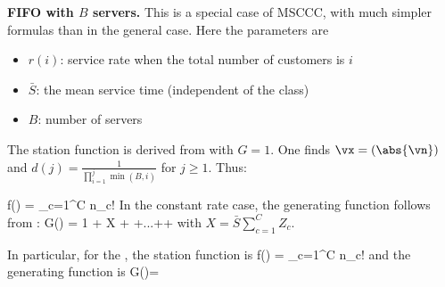 \textbf{FIFO with $B$ servers.} This is a special
case of MSCCC, with much simpler formulas than in
        the general case. Here the parameters are
    \begin{itemize}
         \item$r(i)$: service rate when the total number
             of customers is $i$
         \item $\bar{S}$: the mean service time
             (independent of the class)
             \item $B$: number of servers
\end{itemize}
The station function is derived from  with
$G=1$. One finds $\vx=(\abs{\vn})$ and $d(j)=
\frac{1}{\prod_{i=1}^j \min(B,i)}$ for $j\geq 1$. Thus:

\be f(\vn)   =
 \frac{\abs{\vn} !}
{\prod_{c=1}^C
 n_c!
  }\label{eq-q-stat-fifo}
 \ee
In the constant rate case, the generating
function follows from :
 \be
G(\vZ) = 1 + X + 
+...++ \label{eq-q-stat-fifo-z} \ee
with $X=\bar{S}\sum_{c=1}^C Z_c$.

In particular, for the , the station function is \be f(\vn) =
{\prod_{c=1}^C n_c! }\label{eq-q-stat-fifo1}\ee
and the generating function is
 \be
G(\vZ)=
\label{eq-q-qnet-gen-f-fifo}
 \ee

